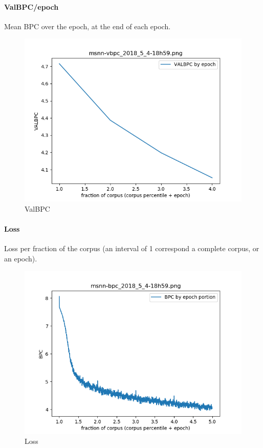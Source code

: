 \paragraph{ValBPC/epoch}

Mean BPC over the epoch, at the end of each epoch.

\begin{figure}[h]
\centering
\includegraphics{parts/appendix/reports-gmsnn/docs_esteban-latex/test_reports/msnn-base/msnn-vbpc_2018_5_4-18h59.png}
\caption{ValBPC}
\end{figure}

\paragraph{Loss}

Loss per fraction of the corpus (an interval of 1 correspond a complete
corpus, or an epoch).

\begin{figure}[h]
\centering
\includegraphics{parts/appendix/reports-gmsnn/docs_esteban-latex/test_reports/msnn-base/msnn-bpc_2018_5_4-18h59.png}
\caption{Loss}
\end{figure}

